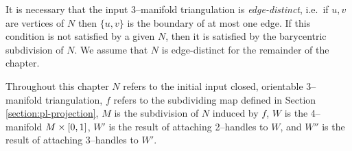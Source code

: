 It is necessary that the input 3--manifold triangulation is \emph{edge-distinct}, i.e.\ if $u,v$ are vertices of $N$ then $\{u,v\}$ is the boundary of at most one edge.
If this condition is not satisfied by a given $N$, then it is satisfied by the barycentric subdivision of $N$.
We assume that $N$ is edge-distinct for the remainder of the chapter.

Throughout this chapter $N$ refers to the initial input closed, orientable 3--manifold triangulation, $f$ refers to the subdividing map defined in Section \ref{section:pl-projection}, $M$ is the subdivision of $N$ induced by $f$, $W$ is the 4--manifold $M\times[0,1]$, $W'$ is the result of attaching 2--handles to $W$, and $W''$ is the result of attaching 3--handles to $W'$.














